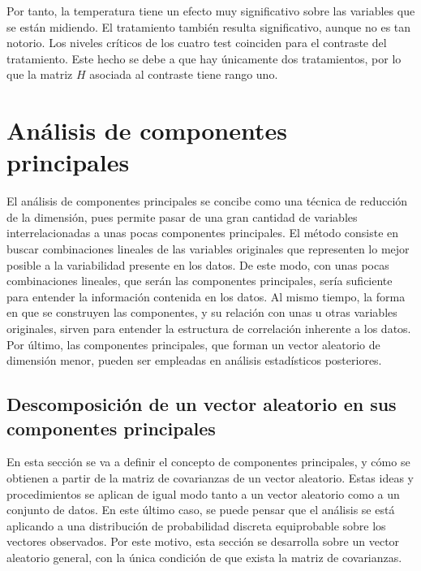 \documentclass[
  a4paper,
  oneside]{scrbook}
\theoremstyle{definition}
\theoremstyle{definition}
\theoremstyle{definition}
\theoremstyle{definition}
\theoremstyle{remark}
\begin{document}
\normalsize

Por tanto, la temperatura tiene un efecto muy significativo sobre las
variables que se están midiendo. El tratamiento también resulta
significativo, aunque no es tan notorio. Los niveles críticos de los
cuatro test coinciden para el contraste del tratamiento. Este hecho se
debe a que hay únicamente dos tratamientos, por lo que la matriz \(H\)
asociada al contraste tiene rango uno.

\chapter{Análisis de componentes principales}\label{analisis-de-componentes-principales}

El análisis de componentes principales se concibe como una técnica de
reducción de la dimensión, pues permite pasar de una gran cantidad de
variables interrelacionadas a unas pocas componentes principales. El
método consiste en buscar combinaciones lineales de las variables
originales que representen lo mejor posible a la variabilidad presente
en los datos. De este modo, con unas pocas combinaciones lineales, que
serán las componentes principales, sería suficiente para entender la
información contenida en los datos. Al mismo tiempo, la forma en que se
construyen las componentes, y su relación con unas u otras variables
originales, sirven para entender la estructura de correlación inherente
a los datos. Por último, las componentes principales, que forman un
vector aleatorio de dimensión menor, pueden ser empleadas en análisis
estadísticos posteriores.

\section{Descomposición de un vector aleatorio en sus componentes principales}\label{descomposicion-de-un-vector-aleatorio-en-sus-componentes-principales}

En esta sección se va a definir el concepto de componentes principales,
y cómo se obtienen a partir de la matriz de covarianzas de un vector
aleatorio. Estas ideas y procedimientos se aplican de igual modo tanto a
un vector aleatorio como a un conjunto de datos. En este último caso, se
puede pensar que el análisis se está aplicando a una distribución de
probabilidad discreta equiprobable sobre los vectores observados. Por
este motivo, esta sección se desarrolla sobre un vector aleatorio
general, con la única condición de que exista la matriz de covarianzas.
\end{document}
